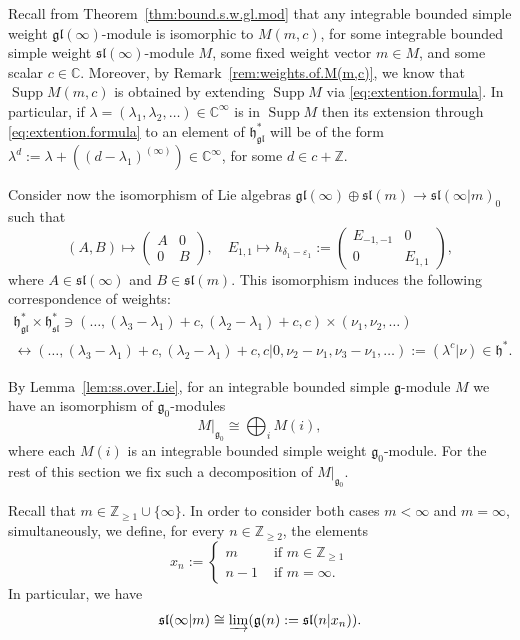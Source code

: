 \documentclass[12pt]{amsart}
\newcommand\C{\mathbb{C}}
\newcommand\Z{\mathbb{Z}}
\newcommand\g{\mathfrak{g}}
\newcommand\fh{\mathfrak{h}}
\newcommand\fsl{\mathfrak{sl}}
\newcommand\fgl{\mathfrak{gl}}
\DeclareMathOperator{\Supp}{Supp} %
\theoremstyle{plain}
\theoremstyle{definition}
\numberwithin{equation}{section}
\begin{document}
Recall from Theorem~\ref{thm:bound.s.w.gl.mod} that any integrable bounded simple weight $\fgl(\infty)$-module is isomorphic to $M(m,c)$, for some integrable bounded simple weight $\fsl(\infty)$-module $M$, some fixed weight vector $m\in M$, and some scalar $c\in \C$. Moreover, by Remark~\ref{rem:weights.of.M(m,c)}, we know that $\Supp M(m,c)$ is obtained by extending $\Supp M$ via \eqref{eq:extention.formula}. In particular, if $\lambda = (\lambda_1, \lambda_2,\ldots)\in \C^\infty$ is in $\Supp M$ then its extension through \eqref{eq:extention.formula} to an element of $\fh_\fgl^*$ will be of the form $\lambda^d:= \lambda+((d-\lambda_1)^{(\infty)}) \in \C^\infty$, for some $d\in c + \Z$.

Consider now the isomorphism of Lie algebras $\fgl(\infty)\oplus \fsl(m) \to \fsl(\infty|m)_0$ such that
	\[
(A,B)\mapsto \left(\begin{array}{c|c}
    A & 0  \\
\hline
    0 & B
  \end{array}\right),\quad E_{1,1}\mapsto h_{\delta_1 - \varepsilon_1}:=\left(\begin{array}{c|c}
    E_{-1,-1} & 0  \\
\hline
    0 & E_{1,1}
  \end{array}\right),
	\]
where $A\in \fsl(\infty)$ and $B\in \fsl(m)$. This isomorphism induces the following correspondence of weights:
\begin{multline*}
\fh_{\fgl}^*\times \fh_\fsl^*\ni (\ldots, (\lambda_3- \lambda_1) +c, (\lambda_2- \lambda_1) + c, c)\times (\nu_1, \nu_2, \ldots) \\
\leftrightarrow (\ldots, (\lambda_3- \lambda_1) +c, (\lambda_2- \lambda_1) + c, c | 0, \nu_2 - \nu_1, \nu_3 - \nu_1,\ldots) := (\lambda^c | \nu)\in \fh^*.
\end{multline*}

By Lemma~\ref{lem:ss.over.Lie}, for an integrable bounded simple $\g$-module $M$ we have an isomorphism of $\g_0$-modules
	\[
M|_{\g_0}\cong \bigoplus_i M(i),
	\]
where each $M(i)$ is an integrable bounded simple weight $\g_0$-module. For the rest of this section we fix such a decomposition of $M|_{\g_0}$.

Recall that $m\in \Z_{\geq 1}\cup \{\infty\}$. In order to consider both cases $m<\infty$ and $m=\infty$, simultaneously, we define, for every $n\in \Z_{\geq 2}$, the elements
	\[ 
x_n := \begin{cases} 
	m & \text{ if } m\in \Z_{\geq 1} \\
n-1 & \text{ if } m=\infty.
  \end{cases}
	\]
In particular, we have  
	\[
\fsl(\infty|m) \cong \varinjlim (\g(n):=\fsl(n|x_n)).
	\]
\end{document}
